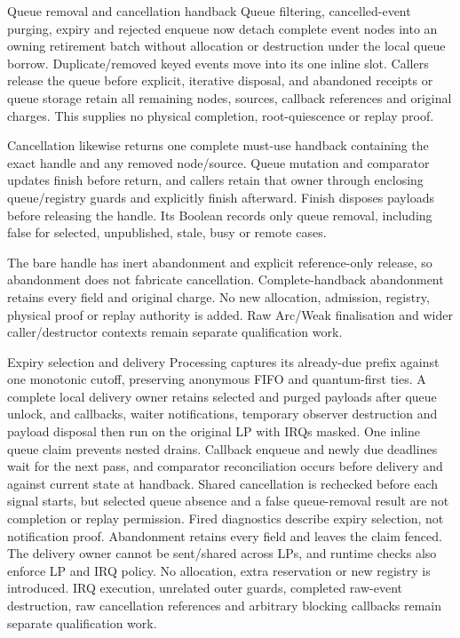 \begin{implementationdetail}{Queue removal and cancellation handback}
Queue filtering, cancelled-event purging, expiry and rejected enqueue now
detach complete event nodes into an owning retirement batch without allocation
or destruction under the local queue borrow. Duplicate/removed keyed events
move into its one inline slot. Callers release the queue before explicit,
iterative disposal, and abandoned receipts or queue storage retain all remaining
nodes, sources, callback references and original charges. This supplies no
physical completion, root-quiescence or replay proof.

Cancellation likewise returns one complete must-use handback containing the
exact handle and any removed node/source. Queue mutation and comparator updates
finish before return, and callers retain that owner through enclosing queue/registry
guards and explicitly finish afterward. Finish disposes payloads before releasing
the handle. Its Boolean records only queue removal, including false for selected,
unpublished, stale, busy or remote cases.

The bare handle has inert abandonment
and explicit reference-only release, so abandonment does not fabricate cancellation.
Complete-handback abandonment retains every field and original charge. No new
allocation, admission, registry, physical proof or replay authority is added.
Raw Arc/Weak finalisation and wider caller/destructor contexts remain separate
qualification work.
\end{implementationdetail}

\begin{implementationdetail}{Expiry selection and delivery}
Processing captures its already-due prefix against one monotonic cutoff,
preserving anonymous FIFO and quantum-first ties. A complete local delivery
owner retains selected and purged payloads after queue unlock, and callbacks,
waiter notifications, temporary observer destruction and payload disposal then
run on the original LP with IRQs masked. One inline queue claim prevents nested
drains. Callback enqueue and newly due deadlines wait for the next pass, and
comparator reconciliation occurs before delivery and against current state at
handback. Shared cancellation is rechecked before each signal starts, but selected
queue absence and a false queue-removal result are not completion or replay
permission. Fired diagnostics describe expiry selection, not notification proof.
Abandonment retains every field and leaves the claim fenced. The delivery owner
cannot be sent/shared across LPs, and runtime checks also enforce LP and IRQ policy.
No allocation, extra reservation or new registry is introduced. IRQ execution,
unrelated outer guards, completed raw-event destruction, raw cancellation
references and arbitrary blocking callbacks remain separate qualification work.
\end{implementationdetail}

